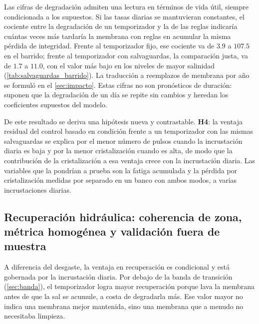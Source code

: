 Las cifras de degradaci\'on admiten una lectura en t\'erminos de vida \'util, siempre condicionada a los supuestos. Si las tasas diarias se mantuvieran constantes, el cociente entre la degradaci\'on de un temporizador y la de las reglas indicar\'ia cu\'antas veces m\'as tardar\'ia la membrana con reglas en acumular la misma p\'erdida de integridad. Frente al temporizador fijo, ese cociente va de $3.9$ a $107.5$ en el barrido; frente al temporizador con salvaguardas, la comparaci\'on justa, va de $1.7$ a $11.0$, con el valor m\'as bajo en los niveles de mayor salinidad (\cref{tab:salvaguardas_barrido}). La traducci\'on a reemplazos de membrana por a\~no se formul\'o en el \cref{sec:impacto}. Estas cifras no son pron\'osticos de duraci\'on: suponen que la degradaci\'on de un d\'ia se repite sin cambios y heredan los coeficientes supuestos del modelo.

De este resultado se deriva una hip\'otesis nueva y contrastable. \textbf{H4}: la ventaja residual del control basado en condici\'on frente a un temporizador con las mismas salvaguardas se explica por el menor n\'umero de pulsos cuando la incrustaci\'on diaria es baja y por la menor cristalizaci\'on cuando es alta, de modo que la contribuci\'on de la cristalizaci\'on a esa ventaja crece con la incrustaci\'on diaria. Las variables que la pondr\'ian a prueba son la fatiga acumulada y la p\'erdida por cristalizaci\'on medidas por separado en un banco con ambos modos, a varias incrustaciones diarias.

\subsection{Recuperaci\'on hidr\'aulica: coherencia de zona, m\'etrica homog\'enea y validaci\'on fuera de muestra}
A diferencia del desgaste, la ventaja en recuperaci\'on es condicional y est\'a gobernada por la incrustaci\'on diaria. Por debajo de la banda de transici\'on (\cref{sec:banda}), el temporizador logra mayor recuperaci\'on porque lava la membrana antes de que la sal se acumule, a costa de degradarla m\'as. Ese valor mayor no indica una membrana mejor mantenida, sino una membrana que a menudo no necesitaba limpieza.

